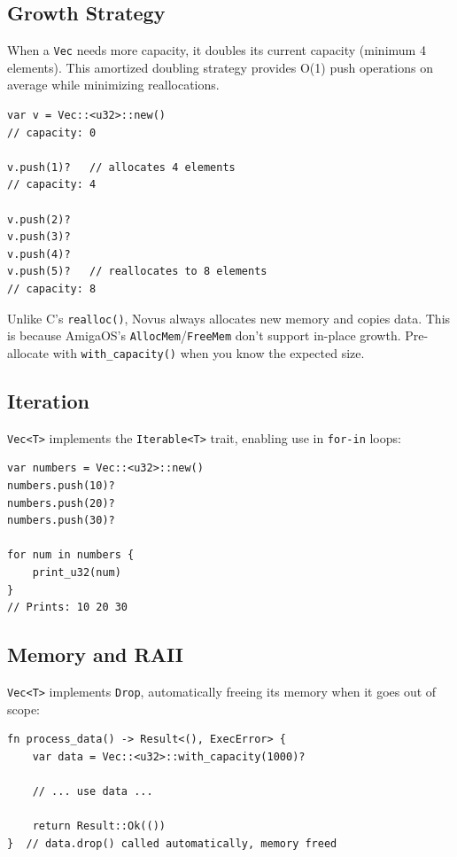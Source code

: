 \subsection{Growth Strategy}

When a \texttt{Vec} needs more capacity, it doubles its current capacity (minimum 4 elements). This amortized doubling strategy provides O(1) push operations on average while minimizing reallocations.

\begin{lstlisting}
var v = Vec::<u32>::new()
// capacity: 0

v.push(1)?   // allocates 4 elements
// capacity: 4

v.push(2)?
v.push(3)?
v.push(4)?
v.push(5)?   // reallocates to 8 elements
// capacity: 8
\end{lstlisting}

\begin{comingfromc}
Unlike C's \texttt{realloc()}, Novus always allocates new memory and copies data. This is because AmigaOS's \texttt{AllocMem}/\texttt{FreeMem} don't support in-place growth. Pre-allocate with \texttt{with\_capacity()} when you know the expected size.
\end{comingfromc}

\subsection{Iteration}

\texttt{Vec<T>} implements the \texttt{Iterable<T>} trait, enabling use in \texttt{for-in} loops:

\begin{lstlisting}
var numbers = Vec::<u32>::new()
numbers.push(10)?
numbers.push(20)?
numbers.push(30)?

for num in numbers {
    print_u32(num)
}
// Prints: 10 20 30
\end{lstlisting}

\subsection{Memory and RAII}

\texttt{Vec<T>} implements \texttt{Drop}, automatically freeing its memory when it goes out of scope:

\begin{lstlisting}
fn process_data() -> Result<(), ExecError> {
    var data = Vec::<u32>::with_capacity(1000)?

    // ... use data ...

    return Result::Ok(())
}  // data.drop() called automatically, memory freed
\end{lstlisting}

